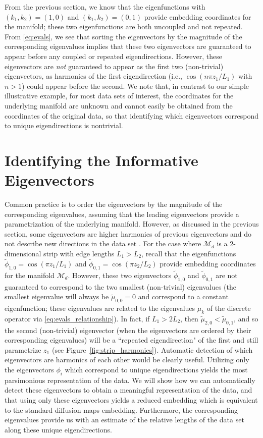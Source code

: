\documentclass[3p]{elsarticle}
\begin{document}
From the previous section, we know that the eigenfunctions with $(k_1, k_2) =(1, 0)$ and $(k_1, k_2) =(0, 1)$
provide embedding coordinates for the manifold; these two eigenfunctions are both uncoupled and not repeated.
%
From \eqref{eq:evals}, we see that sorting the eigenvectors by the magnitude of
the corresponding eigenvalues implies that these two eigenvectors are guaranteed to
appear before any coupled or repeated eigendirections.
%
However, these eigenvectors are {\em not} guaranteed to appear as the first two (non-trivial) eigenvectors,
as harmonics of the first eigendirection (i.e., $\cos \left( n \pi z_1 / L_1 \right)$ with $n > 1$) could appear before the second.
%
We note that, in contrast to our simple illustrative example, for most data sets of interest, the coordinates for the underlying manifold are unknown and cannot easily be obtained from the coordinates of the original data, so that identifying which eigenvectors correspond to unique eigendirections is nontrivial.

\section{Identifying the Informative Eigenvectors }

Common practice is to order the eigenvectors by the magnitude of the corresponding eigenvalues,
assuming that the leading eigenvectors provide a parametrization of the underlying manifold.
%
However, as discussed in the previous section, some eigenvectors are higher harmonics of
previous eigenvectors and do not describe new directions in the data set \cite{gerber2007robust}.
%
For the case where $\mathcal{M}_d$ is a $2$-dimensional strip with edge lengths $L_1  > L_2$, recall
that the eigenfunctions $\tilde{\phi}_{1,0} = \cos \left(  {\pi z_1}/{L_1} \right)$ and
$\tilde{\phi}_{0,1} = \cos \left(  {\pi z_2}/{L_2} \right)$ provide embedding coordinates for the manifold $\mathcal{M}_d$.
%
However, these two eigenvectors $\tilde{\phi}_{1, 0}$ and $\tilde{\phi}_{0, 1}$ are not guaranteed to
correspond to the two smallest (non-trivial) eigenvalues (the smallest eigenvalue will always be $\tilde{\mu}_{0,0} = 0$ and
correspond to a constant eigenfunction; these eigenvalues are related to the eigenvalues $\mu_k$ of the discrete
operator via \eqref{eq:evals_relationship}).
%
In fact, if $L_1 > 2 L_2$, then $\tilde{\mu}_{2, 0} < \tilde{\mu}_{0, 1}$, and so the
second (non-trivial) eigenvector (when the eigenvectors are ordered by their corresponding eigenvalues)
will be a ``repeated eigendirection" of the first and still parametrize $z_1$ (see Figure~\ref{fig:strip_harmonics}).
%
Automatic detection of which eigenvectors are harmonics of each other would be clearly useful.
%
Utilizing only the eigenvectors $\phi_i$ which correspond to unique eigendirections yields
the most parsimonious representation of the data.
%
We will show how we can automatically detect these eigenvectors to obtain a meaningful representation of the data,
and that using only these eigenvectors yields a reduced embedding which is equivalent to the standard diffusion maps embedding.
%
Furthermore, the corresponding eigenvalues provide us with an estimate of the relative lengths of the data set along these unique eigendirections.
\end{document}

